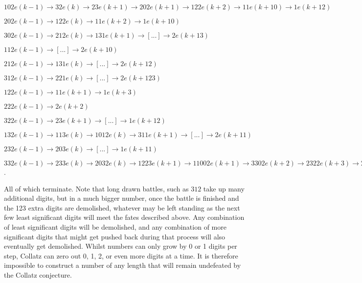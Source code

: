 \documentclass[10pt,a4paper,showpacs,nofootinbib,aps,superscriptaddress,eqsecnum,prd,showkeys,notitlepage]{article}
\begin{document}
$102e(k-1) \rightarrow 32e(k) \rightarrow 23e(k+1) \rightarrow 202e(k+1) \rightarrow 122e(k+2) \rightarrow 11e(k+10) \rightarrow 1e(k+12)$

$202e(k-1) \rightarrow 122e(k) \rightarrow 11e(k+2) \rightarrow 1e(k+10)$

$302e(k-1) \rightarrow 212e(k) \rightarrow 131e(k+1) \rightarrow [...] \rightarrow 2e(k+13)$

$112e(k-1) \rightarrow [...] \rightarrow 2e(k+10)$

$212e(k-1) \rightarrow 131e(k) \rightarrow [...] \rightarrow 2e(k+12)$

$312e(k-1) \rightarrow 221e(k) \rightarrow [...] \rightarrow 2e(k+123)$

$122e(k-1) \rightarrow 11e(k+1) \rightarrow 1e(k+3)$

$222e(k-1) \rightarrow 2e(k+2)$

$322e(k-1) \rightarrow 23e(k+1) \rightarrow [...] \rightarrow 1e(k+12)$

$132e(k-1) \rightarrow 113e(k) \rightarrow 1012e(k) \rightarrow 311e(k+1) \rightarrow [...] \rightarrow 2e(k+11)$

$232e(k-1) \rightarrow 203e(k) \rightarrow [...] \rightarrow 1e(k+11)$

$332e(k-1) \rightarrow 233e(k) \rightarrow 2032e(k) \rightarrow 1223e(k+1) \rightarrow 11002e(k+1) \rightarrow 3302e(k+2) \rightarrow 2322e(k+3) \rightarrow 202e(k+11) \rightarrow [...] \rightarrow 1e(k+21)$.

All of which terminate. 
Note that long drawn battles, such as $312$ take up many additional digits, but in a much bigger number, once the battle is finished and the 123 extra digits are demolished, whatever may be left standing as the next few least significant digits will meet the fates described above. Any combination of least significant digits will be demolished, and any combination of more significant digits that might get pushed back during that process will also eventually get demolished. Whilst numbers can only grow by 0 or 1 digits per step, Collatz can zero out 0, 1, 2, or even more digits at a time.
It is therefore impossible to construct a number of any length that will remain undefeated by the Collatz conjecture.
\end{document}
